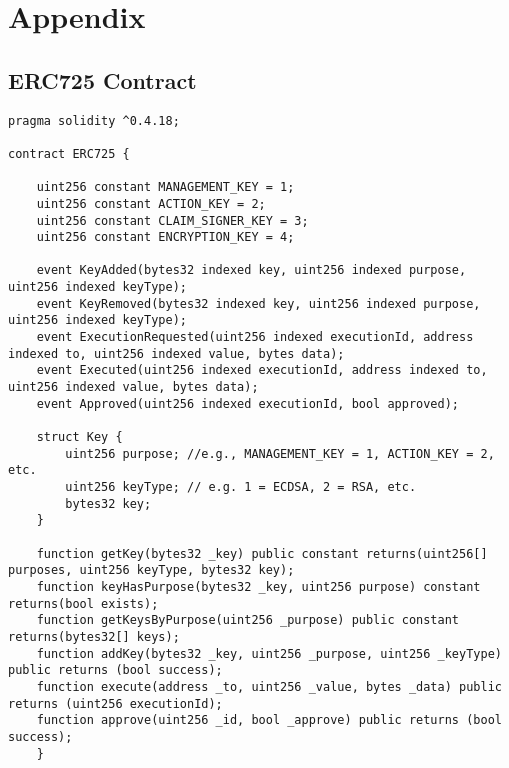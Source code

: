 \section{Appendix}

\subsection{ERC725 Contract}\label{app:identity_contract}

\begin{lstlisting}[language=solidity]
pragma solidity ^0.4.18;

contract ERC725 {

    uint256 constant MANAGEMENT_KEY = 1;
    uint256 constant ACTION_KEY = 2;
    uint256 constant CLAIM_SIGNER_KEY = 3;
    uint256 constant ENCRYPTION_KEY = 4;

    event KeyAdded(bytes32 indexed key, uint256 indexed purpose, uint256 indexed keyType);
    event KeyRemoved(bytes32 indexed key, uint256 indexed purpose, uint256 indexed keyType);
    event ExecutionRequested(uint256 indexed executionId, address indexed to, uint256 indexed value, bytes data);
    event Executed(uint256 indexed executionId, address indexed to, uint256 indexed value, bytes data);
    event Approved(uint256 indexed executionId, bool approved);

    struct Key {
        uint256 purpose; //e.g., MANAGEMENT_KEY = 1, ACTION_KEY = 2, etc.
        uint256 keyType; // e.g. 1 = ECDSA, 2 = RSA, etc.
        bytes32 key;
    }

    function getKey(bytes32 _key) public constant returns(uint256[] purposes, uint256 keyType, bytes32 key);
    function keyHasPurpose(bytes32 _key, uint256 purpose) constant returns(bool exists);
    function getKeysByPurpose(uint256 _purpose) public constant returns(bytes32[] keys);
    function addKey(bytes32 _key, uint256 _purpose, uint256 _keyType) public returns (bool success);
    function execute(address _to, uint256 _value, bytes _data) public returns (uint256 executionId);
    function approve(uint256 _id, bool _approve) public returns (bool success);
    }
\end{lstlisting}